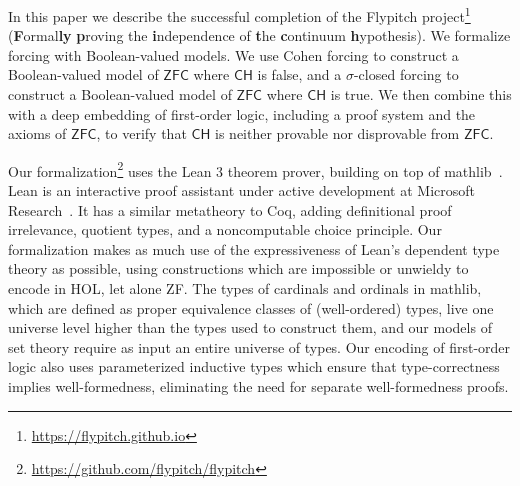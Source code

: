 \documentclass[sigplan,10pt,review]{acmart}
\newcommand{\ZFC}{\mathsf{ZFC}}
\newcommand{\CH}{\mathsf{CH}}
\theoremstyle{definition}
\begin{document}
In this paper we describe the successful completion of the Flypitch project\footnote{\url{https://flypitch.github.io}} (\textbf{F}ormal\textbf{ly} \textbf{p}roving the \textbf{i}ndependence of \textbf{t}he \textbf{c}ontinuum \textbf{h}ypothesis).
We formalize forcing with Boolean-valued models. We use Cohen forcing to construct a Boolean-valued model of \(\ZFC\) where \(\CH\) is false, and a \(\sigma\)-closed forcing to construct a Boolean-valued model of \(\ZFC\) where \(\CH\) is true. We then combine this with a deep embedding of first-order logic, including a proof system and the axioms of \(\ZFC\), to verify that \(\CH\) is neither provable nor disprovable from \(\ZFC\).

Our formalization\footnote{\url{https://github.com/flypitch/flypitch}} uses the Lean 3 theorem prover, building on top of \textsf{mathlib}~\cite{mathlib}. %
Lean is an interactive proof assistant under active development at Microsoft Research~\cite{de2015lean, ullrich2019counting}. It has a similar metatheory to Coq, adding definitional proof irrelevance, quotient types, and a noncomputable choice principle.
Our formalization makes as much use of the expressiveness of Lean's dependent type theory as possible, using constructions which are impossible or unwieldy to encode in HOL, let alone ZF.
The types of cardinals and ordinals in \textsf{mathlib}, which are defined as proper equivalence classes of (well-ordered) types, live one universe level higher than the types used to construct them, and our models of set theory require as input an entire universe of types. Our encoding of first-order logic also uses parameterized inductive types which ensure that type-correctness implies well-formedness, eliminating the need for separate well-formedness proofs.

\end{document}
